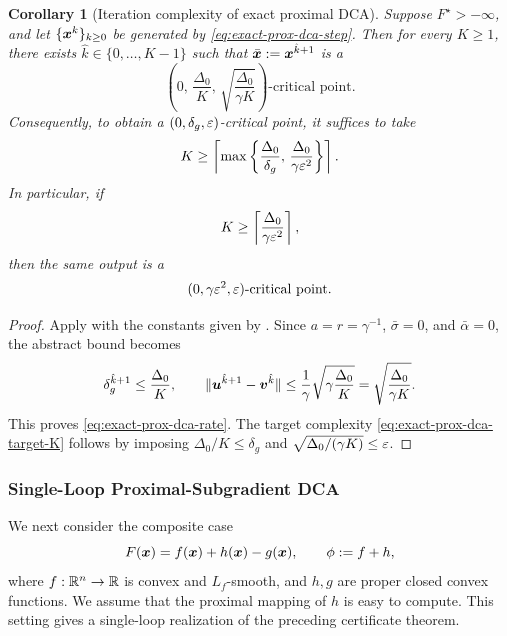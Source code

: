 \documentclass[english]{article}
\newtheorem{corollary}{Corollary}[section]
\begin{document}
\begin{corollary}[Iteration complexity of exact proximal DCA]
\label{cor:exact-prox-dca-complexity}
Suppose $F^\star>-\infty$, and let $\{\bm{x}^k\}_{k\ge0}$ be generated by
\eqref{eq:exact-prox-dca-step}. Then for every $K\ge1$, there exists
$\hat k\in\{0,\ldots,K-1\}$ such that
$\bar{\bm{x}}:=\bm{x}^{\hat k+1}$ is a
\begin{equation}
    \left(
        0,\,
        \frac{\Delta_0}{K},\,
        \sqrt{\frac{\Delta_0}{\gamma K}}
    \right)\text{-critical point}.
    \label{eq:exact-prox-dca-rate}
\end{equation}
Consequently, to obtain a $(0,\delta_g,\varepsilon)$-critical point, it
suffices to take
\begin{equation}
    K
    \ge
    \left\lceil
    \max\left\{
        \frac{\Delta_0}{\delta_g},\,
        \frac{\Delta_0}{\gamma\varepsilon^2}
    \right\}
    \right\rceil .
    \label{eq:exact-prox-dca-target-K}
\end{equation}
In particular, if
\[
    K\ge
    \left\lceil
        \frac{\Delta_0}{\gamma\varepsilon^2}
    \right\rceil ,
\]
then the same output is a
\[
    (0,\gamma\varepsilon^2,\varepsilon)\text{-critical point}.
\]
\end{corollary}

\begin{proof}
Apply  with the constants
given by . Since
$a=r=\gamma^{-1}$, $\bar\sigma=0$, and $\bar\alpha=0$, the abstract
bound becomes
\[
    \delta_g^{\hat k+1}\le\frac{\Delta_0}{K},
    \qquad
    \|\bm{u}^{\hat k+1}-\bm{v}^{\hat k}\|
    \le
    \frac{1}{\gamma}
    \sqrt{\gamma\frac{\Delta_0}{K}}
    =
    \sqrt{\frac{\Delta_0}{\gamma K}}.
\]
This proves \eqref{eq:exact-prox-dca-rate}. The target complexity
\eqref{eq:exact-prox-dca-target-K} follows by imposing
$\Delta_0/K\le\delta_g$ and
$\sqrt{\Delta_0/(\gamma K)}\le\varepsilon$.
\end{proof}

\subsubsection{Single-Loop Proximal-Subgradient DCA}

We next consider the composite case
\begin{equation}
    F(\bm{x})=f(\bm{x})+h(\bm{x})-g(\bm{x}),
    \qquad
    \phi:=f+h,
    \label{eq:composite-ps-dca-model}
\end{equation}
where $f:\mathbb{R}^n\to\mathbb{R}$ is convex and $L_f$-smooth, and $h,g$ are
proper closed convex functions. We assume that the proximal mapping of
$h$ is easy to compute. This setting gives a single-loop realization of
the preceding certificate theorem.
\end{document}

